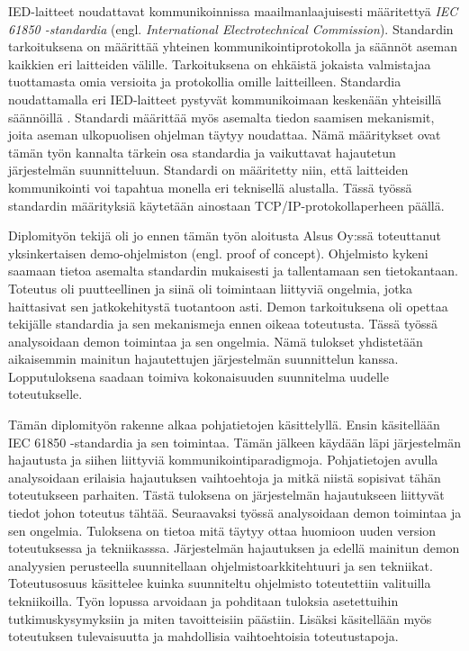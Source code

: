 IED-laitteet noudattavat kommunikoinnissa maailmanlaajuisesti määritettyä \emph{IEC 61850 -standardia} (engl. \emph{International Electrotechnical Commission}). Standardin tarkoituksena on määrittää yhteinen kommunikointiprotokolla ja säännöt aseman kaikkien eri laitteiden välille. Tarkoituksena on ehkäistä jokaista valmistajaa tuottamasta omia versioita ja protokollia omille laitteilleen. Standardia noudattamalla eri IED-laitteet pystyvät kommunikoimaan keskenään yhteisillä säännöillä \cite[s.~624]{Mackiewicz2006}. Standardi määrittää myös asemalta tiedon saamisen mekanismit, joita aseman ulkopuolisen ohjelman täytyy noudattaa. Nämä määritykset ovat tämän työn kannalta tärkein osa standardia ja vaikuttavat hajautetun järjestelmän suunnitteluun. Standardi on määritetty niin, että laitteiden kommunikointi voi tapahtua monella eri teknisellä alustalla. Tässä työssä standardin määrityksiä käytetään ainostaan TCP/IP-protokollaperheen päällä.

Diplomityön tekijä oli jo ennen tämän työn aloitusta Alsus Oy:ssä toteuttanut yksinkertaisen demo-ohjelmiston (engl. proof of concept). Ohjelmisto kykeni saamaan tietoa asemalta standardin mukaisesti ja tallentamaan sen tietokantaan. Toteutus oli puutteellinen ja siinä oli toimintaan liittyviä ongelmia, jotka haittasivat sen jatkokehitystä tuotantoon asti. Demon tarkoituksena oli opettaa tekijälle standardia ja sen mekanismeja ennen oikeaa toteutusta. Tässä työssä analysoidaan demon toimintaa ja sen ongelmia. Nämä tulokset yhdistetään aikaisemmin mainitun hajautettujen järjestelmän suunnittelun kanssa. Lopputuloksena saadaan toimiva kokonaisuuden suunnitelma uudelle toteutukselle.

Tämän diplomityön rakenne alkaa pohjatietojen käsittelyllä. Ensin käsitellään IEC 61850 -standardia ja sen toimintaa. Tämän jälkeen käydään läpi järjestelmän hajautusta ja siihen liittyviä kommunikointiparadigmoja. Pohjatietojen avulla analysoidaan erilaisia hajautuksen vaihtoehtoja ja mitkä niistä sopisivat tähän toteutukseen parhaiten. Tästä tuloksena on järjestelmän hajautukseen liittyvät tiedot johon toteutus tähtää. Seuraavaksi työssä analysoidaan demon toimintaa ja sen ongelmia. Tuloksena on tietoa mitä täytyy ottaa huomioon uuden version toteutuksessa ja tekniikasssa. Järjestelmän hajautuksen ja edellä mainitun demon analyysien perusteella suunnitellaan ohjelmistoarkkitehtuuri ja sen tekniikat. Toteutusosuus käsittelee kuinka suunniteltu ohjelmisto toteutettiin valituilla tekniikoilla. Työn lopussa arvoidaan ja pohditaan tuloksia asetettuihin tutkimuskysymyksiin ja miten tavoitteisiin päästiin. Lisäksi käsitellään myös toteutuksen tulevaisuutta ja mahdollisia vaihtoehtoisia toteutustapoja.


